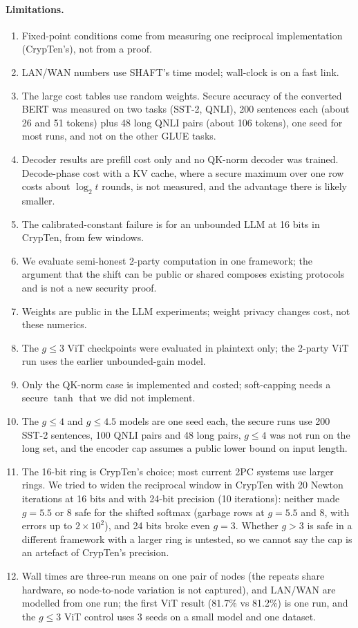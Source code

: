 \documentclass[11pt]{article}
\begin{document}
\paragraph{Limitations.}
\begin{enumerate}\setlength{\itemsep}{1pt}
\item Fixed-point conditions come from measuring one reciprocal implementation (CrypTen's), not from a proof.
\item LAN/WAN numbers use SHAFT's time model; wall-clock is on a fast link.
\item The large cost tables use random weights. Secure accuracy of the converted BERT was measured on two tasks (SST-2, QNLI),
200 sentences each (about 26 and 51 tokens) plus 48 long QNLI pairs (about 106 tokens), one seed for most runs, and not on the other GLUE tasks.
\item Decoder results are prefill cost only and no QK-norm decoder was trained. Decode-phase cost with a KV cache, where a
secure maximum over one row costs about $\log_2 t$ rounds, is not measured, and the advantage there is likely smaller.
\item The calibrated-constant failure is for an unbounded LLM at 16 bits in CrypTen, from few windows.
\item We evaluate semi-honest 2-party computation in one framework; the argument that the shift can be public or shared
composes existing protocols and is not a new security proof.
\item Weights are public in the LLM experiments; weight privacy changes cost, not these numerics.
\item The $g\le3$ ViT checkpoints were evaluated in plaintext only; the 2-party ViT run uses the earlier unbounded-gain model.
\item Only the QK-norm case is implemented and costed; soft-capping needs a secure $\tanh$ that we did not implement.
\item The $g\le4$ and $g\le4.5$ models are one seed each, the secure runs use 200 SST-2 sentences, 100 QNLI pairs and 48 long pairs, $g\le4$ was not run on the long set, and the encoder cap assumes a public lower bound on input length.
\item The 16-bit ring is CrypTen's choice; most current 2PC systems use larger rings. We tried to widen the reciprocal window in CrypTen with 20 Newton iterations at 16 bits and with 24-bit precision (10 iterations): neither made $g=5.5$ or $8$ safe for the shifted softmax (garbage rows at $g=5.5$ and $8$, with errors up to $2\times10^{2}$), and 24 bits broke even $g=3$. Whether $g>3$ is safe in a different framework with a larger ring is untested, so we cannot say the cap is an artefact of CrypTen's precision.
\item Wall times are three-run means on one pair of nodes (the repeats share hardware, so node-to-node variation is not captured), and LAN/WAN are modelled from one run; the first ViT result (81.7\% vs 81.2\%) is one run, and the $g\le3$ ViT control uses 3 seeds on a small model and one dataset.
\end{enumerate}
\end{document}
